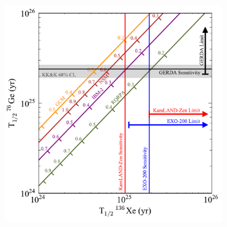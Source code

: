 \documentclass{beamer}
\begin{document}
\begin{frame}
\begin{center}
\includegraphics[keepaspectratio=true,width=3.7in]{MatplotLibSensitivity.pdf}
\end{center}
\end{frame}
\end{document}
